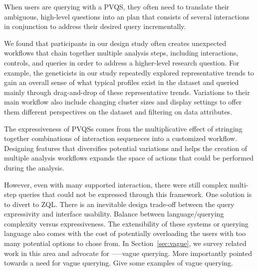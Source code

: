 \par When users are querying with a PVQS, they often need to translate their ambiguous, high-level questions into an plan that consists of several interactions in conjunction to address their desired query incrementally.  
\par We found that participants in our \zv design study often creates unexpected workflows that chain together multiple analysis steps, including interactions, controls, and queries in order to address a higher-level research question. For example, the geneticists in our study repeatedly explored representative trends to gain an overall sense of what typical profiles exist in the dataset and queried mainly through drag-and-drop of these representative trends. Variations to their main workflow also include changing cluster sizes and display settings to offer them different perspectives on the dataset and filtering on data attributes. 
\par The expressiveness of PVQSs comes from the multiplicative effect of stringing together combinations of interaction sequeneces into a customized workflow. Designing features that diversifies potential variations and helps the creation of multiple analysis workflows expands the space of actions that could be performed during the analysis. 
\par However, even with many supported interaction, there were still complex multi-step queries that could not be expressed through this framework. %
One solution is to divert to ZQL. There is an inevitable design trade-off between the query expressivity and interface usability\cite{Morton2014,Jagadish2007}. Balance between language/querying complexity versus expressiveness. The extensibility of these systems or querying language also comes with the cost of potentially overloading the users with too many potential options to chose from. In Section~\ref{sec:vague}, we survey related work in this area and advocate for -----vague querying. More importantly pointed towards a need for vague querying. Give some examples of vague querying.
